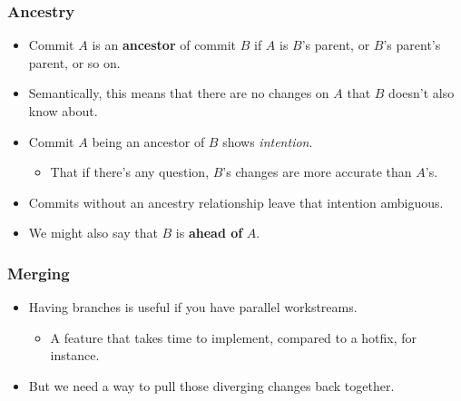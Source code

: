 \documentclass{beamer}
\begin{document}
\begin{frame}
\begin{center}
  \end{center}
\end{frame}

\begin{frame}
  \frametitle{Ancestry}
  
  \begin{itemize}
    \pause
  \item Commit $A$ is an \textbf{ancestor} of commit $B$ if $A$ is $B$'s parent, or $B$'s parent's parent, or so on.
    \pause
  \item Semantically, this means that there are no changes on $A$ that $B$ doesn't also know about.
    \pause
  \item Commit $A$ being an ancestor of $B$ shows \textit{intention}.
    \begin{itemize}
      \pause
    \item That if there's any question, $B$'s changes are more accurate than $A$'s.
    \end{itemize}
    \pause
  \item Commits without an ancestry relationship leave that intention ambiguous.
    \pause
  \item We might also say that $B$ is \textbf{ahead of} $A$.
  \end{itemize}
\end{frame}

\begin{frame}
  \frametitle{Merging}

  \begin{itemize}
    \pause
  \item Having branches is useful if you have parallel workstreams.
    \begin{itemize}
      \pause
    \item A feature that takes time to implement, compared to a hotfix, for instance.
    \end{itemize}
    \pause
  \item But we need a way to pull those diverging changes back together.
  \end{itemize}
\end{frame}
\end{document}
